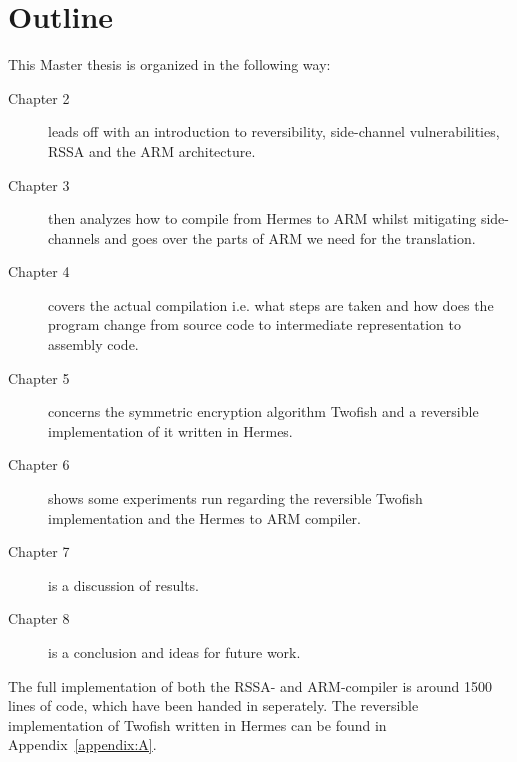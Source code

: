\section{Outline}
This Master thesis is organized in the following way:
\begin{description}
  \item [Chapter 2] leads off with an introduction to reversibility, side-channel vulnerabilities, RSSA and the ARM architecture.
  \item [Chapter 3] then analyzes how to compile from Hermes to ARM whilst mitigating side-channels and goes over the parts of ARM we need for the translation.
  \item [Chapter 4] covers the actual compilation i.e. what steps are taken and how does the program change from source code to intermediate representation to assembly code.
  \item [Chapter 5] concerns the symmetric encryption algorithm Twofish and a reversible implementation of it written in Hermes.
  \item [Chapter 6] shows some experiments run regarding the reversible Twofish implementation and the Hermes to ARM compiler.
  \item [Chapter 7] is a discussion of results.
  \item [Chapter 8] is a conclusion and ideas for future work.
\end{description}
The full implementation of both the RSSA- and ARM-compiler is around 1500 lines of code, which have been handed in seperately.
The reversible implementation of Twofish written in Hermes can be found in Appendix~\ref{appendix:A}.
